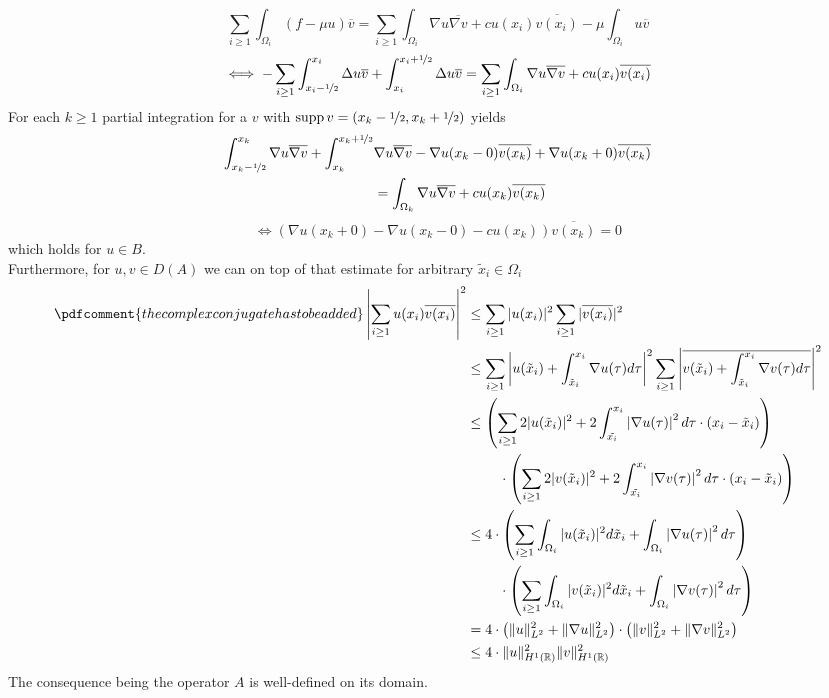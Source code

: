 \documentclass[14pt,a4paper]{scrartcl}
\numberwithin{equation}{section}
\def\supp{\operatorname{supp}}
\newcommand{\R}{\mathbb{R}}
\begin{document}
	\[ \sum_{i \geq 1} \int_{\Omega_{i}}(f-\mu u) \overline{v} = \sum_{i \geq 1} \int_{\Omega_{i}} \nabla u \overline{\nabla v} +c u(x_{i}) \overline{v(x_{i})} - \mu \int_{\Omega_{i}} u \overline{v} \]
	\[ \iff -  \sum_{i \geq 1} \int_{x_{i} - \nicefrac{1}{2}}^{x_{i}} \Delta u \overline{v} + \int_{x_{i}}^{x_{i} + \nicefrac{1}{2}} \Delta u \overline{v} = \sum_{i \geq 1} \int_{\Omega_{i}} \nabla u \overline{\nabla v} + c u(x_{i}) \overline{v(x_{i})} \]
	For each $k \geq 1$ partial integration for a $v$ with $\supp v = (x_{k} - \nicefrac{1}{2}, x_{k} + \nicefrac{1}{2})$ yields
	\begin{align*}
		\int_{x_{k} - \nicefrac{1}{2}}^{x_{k}} \nabla u \overline{\nabla v} + \int_{x_{k}}^{x_{k} +\nicefrac{1}{2}} & \nabla u \overline{\nabla v} - \nabla u(x_{k}-0) \overline{v(x_{k})}  + \nabla u(x_{k}+0) \overline{v(x_{k})} \\
		 & = \int_{\Omega_{k}} \nabla u \overline{\nabla v} + c u(x_{k}) \overline{v(x_{k})}
	\end{align*}
	\[ \iff \left( \nabla u(x_{k}+0) - \nabla u(x_{k}-0) - c u(x_{k}) \right) \overline{v(x_{k})} = 0 \]
	which holds for $u \in B$. \\

	Furthermore, for $u, v \in D(A)$ we can on top of that estimate for arbitrary $\tilde{x}_{i} \in \Omega_{i}$
	\begin{align*} \pdfcomment{the complex conjugate has to be added}
		 \left| \sum_{i \geq 1} u(x_{i}) \overline{v(x_{i})} \right|^{2} & \leq \sum_{i \geq 1} | u(x_{i}) |^{2} \sum_{i \geq 1} | \overline{v(x_{i})} |^{2} \\
		 & \leq \sum_{i \geq 1} \left| u(\tilde{x}_{i}) + \int_{\tilde{x}_{i}}^{x_{i}} \nabla u( \tau ) d\tau \right|^{2} \sum_{i \geq 1} \left| \overline{v(\tilde{x}_{i}) + \int_{\tilde{x}_{i}}^{x_{i}} \nabla v( \tau ) d\tau} \right|^{2} \\
		 & \leq \left( \sum_{i \geq 1} 2 |u(\tilde{x}_{i})|^{2} + 2 \int_{\tilde{x_{i}}}^{x_{i}} \left| \nabla u(\tau) \right|^{2} d\tau \cdot (x_{i} - \tilde{x}_{i}) \right) \\
		 & ~\qquad \cdot \left( \sum_{i \geq 1} 2 |v(\tilde{x}_{i})|^{2} + 2 \int_{\tilde{x_{i}}}^{x_{i}} \left| \nabla v(\tau) \right|^{2} d\tau \cdot (x_{i} - \tilde{x}_{i}) \right) \\		
		 & \leq 4 \cdot \left( \sum_{i \geq 1}  \int_{\Omega_{i}} |u(\tilde{x}_{i})|^{2} d\tilde{x}_{i} +  \int_{\Omega_{i}} \left| \nabla u(\tau) \right|^{2} d\tau \right) \\
		 & ~\qquad \cdot \left( \sum_{i \geq 1} \int_{\Omega_{i}} |v(\tilde{x}_{i})|^{2} d\tilde{x}_{i} + \int_{\Omega_{i}} \left| \nabla v(\tau) \right|^{2} d\tau \right) \\
		& = 4 \cdot \left( \| u \|^{2}_{L^{2}} + \| \nabla u \|^{2}_{L^{2}} \right) \cdot \left( \| v \|^{2}_{L^{2}} + \| \nabla v \|^{2}_{L^{2}} \right) \\
		& \leq 4 \cdot \| u \|^{2}_{H^{1}(\R)} \| v \|^{2}_{H^{1}(\R)}
	\end{align*}
	The consequence being the operator $A$ is well-defined on its domain.
	
\end{document}
